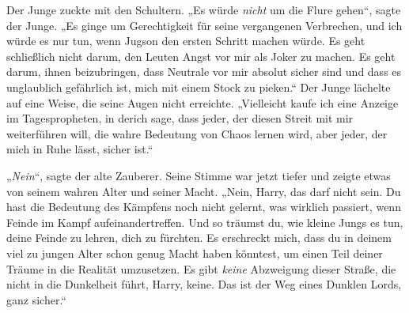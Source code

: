 Der Junge zuckte mit den Schultern. „Es würde \emph{nicht} um die Flure gehen“, sagte der Junge. „Es ginge um Gerechtigkeit für seine vergangenen Verbrechen, und ich würde es nur tun, wenn Jugson den ersten Schritt machen würde. Es geht schließlich nicht darum, den Leuten Angst vor mir als Joker zu machen. Es geht darum, ihnen beizubringen, dass Neutrale vor mir absolut sicher sind und dass es unglaublich gefährlich ist, mich mit einem Stock zu pieken.“ Der Junge lächelte auf eine Weise, die seine Augen nicht erreichte. „Vielleicht kaufe ich eine Anzeige im Tagespropheten, in derich sage, dass jeder, der diesen Streit mit mir weiterführen will, die wahre Bedeutung von Chaos lernen wird, aber jeder, der mich in Ruhe lässt, sicher ist.“

„\emph{Nein}“, sagte der alte Zauberer. Seine Stimme war jetzt tiefer und zeigte etwas von seinem wahren Alter und seiner Macht. „Nein, Harry, das darf nicht sein. Du hast die Bedeutung des Kämpfens noch nicht gelernt, was wirklich passiert, wenn Feinde im Kampf aufeinandertreffen. Und so träumst du, wie kleine Jungs es tun, deine Feinde zu lehren, dich zu fürchten. Es erschreckt mich, dass du in deinem viel zu jungen Alter schon genug Macht haben könntest, um einen Teil deiner Träume in die Realität umzusetzen. Es gibt \emph{keine} Abzweigung dieser Straße, die nicht in die Dunkelheit führt, Harry, keine. Das ist der Weg eines Dunklen Lords, ganz sicher.“

